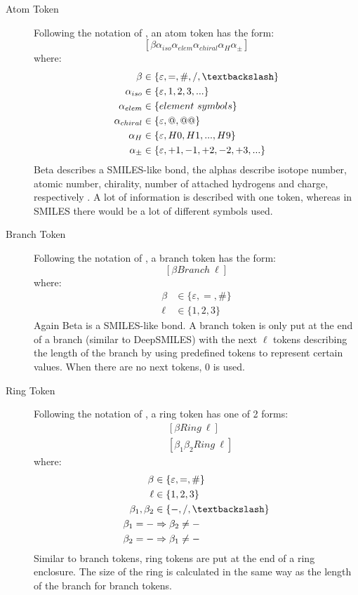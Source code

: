 \begin{description}
    \item[Atom Token] Following the notation of \textcite{lo2023recent}, an atom token has the form:
    \[[\beta\alpha_{iso}\alpha_{elem}\alpha_{chiral}\alpha_{H}\alpha_{\pm}]\]
    where:
    \begin{align*} 
    \beta &\in  \{\varepsilon, = , \#,/, \textbackslash\} \\ 
    \alpha_{iso} &\in  \{\varepsilon,1,2,3,...\} \\
    \alpha_{elem} &\in  \{element\ symbols\} \\ 
    \alpha_{chiral} &\in  \{\varepsilon, @, @@\} \\
    \alpha_{H} &\in  \{\varepsilon,H0,H1,...,H9\} \\
    \alpha_{\pm} &\in  \{\varepsilon,+1,-1,+2,-2,+3,...\}
    \end{align*}
    Beta describes a SMILES-like bond, the alphas describe isotope number, atomic number, chirality, number of attached hydrogens and charge, respectively \cite{lo2023recent}. A lot of information is described with one token, whereas in SMILES there would be a lot of different symbols used.
    
    \item[Branch Token] Following the notation of \textcite{lo2023recent}, a branch token has the form:
    \[[\beta Branch\ \ell]\]
    where:
    \begin{align*} 
    \beta &\in  \{\varepsilon, = , \#\} \\ 
    \ell &\in \{1, 2, 3\}
    \end{align*}
    Again Beta is a SMILES-like bond. A branch token is only put at the end of a branch (similar to DeepSMILES) with the next $\ell$ tokens describing the length of the branch by using predefined tokens to represent certain values. When there are no next tokens, 0 is used.

    \item[Ring Token] Following the notation of \textcite{lo2023recent}, a ring token has one of 2 forms:
    \begin{align*} 
    &[\beta Ring\ \ell] \\ 
    &[\beta_1\beta_2 Ring\ \ell]
    \end{align*} where: \begin{align*} 
    \beta &\in  \{\varepsilon, = , \#\} \\
    \ell &\in \{1, 2, 3\} \\
    \beta_1,\beta_2 &\in \{-, /, \textbackslash\} \\
    \beta_1 = -& \Rightarrow \beta_2 \neq - \\
    \beta_2 = -& \Rightarrow \beta_1 \neq -
    \end{align*}
    Similar to branch tokens, ring tokens are put at the end of a ring enclosure. The size of the ring is calculated in the same way as the length of the branch for branch tokens.


\end{description}

